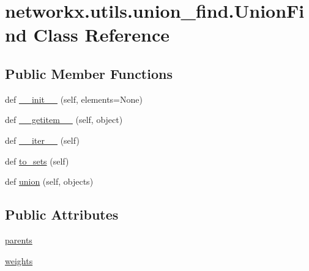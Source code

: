 \hypertarget{classnetworkx_1_1utils_1_1union__find_1_1UnionFind}{}\section{networkx.\+utils.\+union\+\_\+find.\+Union\+Find Class Reference}
\label{classnetworkx_1_1utils_1_1union__find_1_1UnionFind}
\subsection*{Public Member Functions}
\begin{DoxyCompactItemize}
\item 
def \hyperlink{classnetworkx_1_1utils_1_1union__find_1_1UnionFind_add9e2eefbebb3c65b22d39637720807a}{\+\_\+\+\_\+init\+\_\+\+\_\+} (self, elements=None)
\item 
def \hyperlink{classnetworkx_1_1utils_1_1union__find_1_1UnionFind_a7b783446b2e8f931924ad4d776e22f0f}{\+\_\+\+\_\+getitem\+\_\+\+\_\+} (self, object)
\item 
def \hyperlink{classnetworkx_1_1utils_1_1union__find_1_1UnionFind_a8be12eb74fa70d6cd774aee62490af24}{\+\_\+\+\_\+iter\+\_\+\+\_\+} (self)
\item 
def \hyperlink{classnetworkx_1_1utils_1_1union__find_1_1UnionFind_a8ded68db5c76fb2bd008e51156902ad3}{to\+\_\+sets} (self)
\item 
def \hyperlink{classnetworkx_1_1utils_1_1union__find_1_1UnionFind_ad112493d8588afcd5672fe5197028654}{union} (self, objects)
\end{DoxyCompactItemize}
\subsection*{Public Attributes}
\begin{DoxyCompactItemize}
\item 
\hyperlink{classnetworkx_1_1utils_1_1union__find_1_1UnionFind_afa0034f679c612996a25e1bd21eddf45}{parents}
\item 
\hyperlink{classnetworkx_1_1utils_1_1union__find_1_1UnionFind_a981dfbf3404345c5c80b3d36ba0807ab}{weights}
\end{DoxyCompactItemize}


